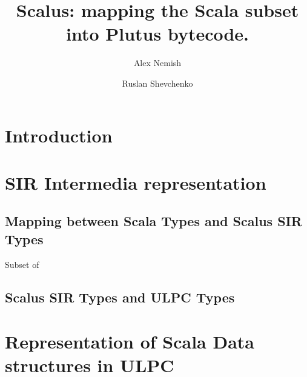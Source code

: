 \documentclass{article}
\title{ Scalus: mapping the Scala subset into Plutus bytecode. }
\author{ Alex Nemish \and Ruslan Shevchenko }
\begin{document}
\section{ Introduction }

\section{ SIR Intermedia representation }

\subsection{ Mapping between Scala Types and Scalus SIR Types }

Subset of 



\subsection{ Scalus SIR Types and ULPC Types }

\section{ Representation of Scala Data structures in ULPC }
\end{document}
